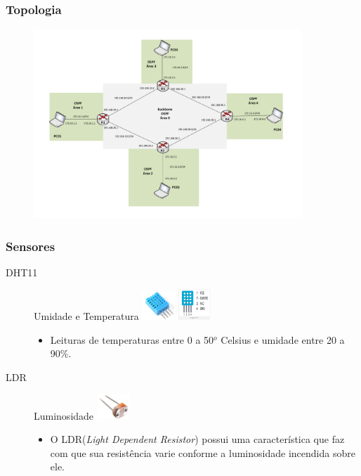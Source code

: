 \begin{frame}
	\frametitle{Topologia}

	\begin{figure}[h]
		\centering
		\includegraphics[width=0.9\textwidth]{"../Relatorio/Artigo IoT-G4/figs/topologia-2"}
		\label{topologia}
 	\end{figure}

\end{frame}


\begin{frame}
	\frametitle{Sensores} %

\begin{description}
	\item [DHT11] Umidade e Temperatura \includegraphics[width=0.1\textwidth]{"../Relatorio/Artigo IoT-G4/figs/dht11"}
	\includegraphics[width=0.1\textwidth]{"../Relatorio/Artigo IoT-G4/figs/dht11-pinagem"}
	\begin{itemize}
		\item Leituras de temperaturas entre 0 a 50$^o$ Celsius e umidade entre 20 a 90\%.
	\end{itemize}
	\item [LDR] Luminosidade \includegraphics[width=0.1\textwidth]{"../Relatorio/Artigo IoT-G4/figs/ldr"}
	\begin{itemize}
		\item O LDR(\textit{Light Dependent Resistor}) possui uma característica que faz com que sua resistência varie conforme a luminosidade incendida  sobre ele.
	\end{itemize}
\end{description}

\end{frame}

